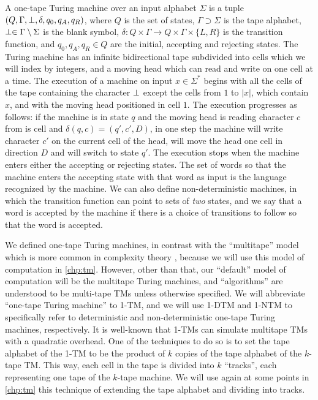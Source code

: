 A one-tape Turing machine over an input alphabet $\Sigma$ is a tuple $(Q, \Gamma, \perp, 
\delta, q_0, q_A, q_R)$, where $Q$ is the set of states, $\Gamma \supset \Sigma$ is the tape alphabet,
$\perp \in \Gamma \setminus \Sigma$ is the blank symbol, 
$\delta \colon Q \times \Gamma \to Q \times \Gamma \times \{L, R\}$ is the transition function, and
$q_0, q_A, q_R \in Q$ are the initial, accepting and rejecting states. The Turing machine 
has an infinite bidirectional tape subdivided into cells which we will index by integers, 
and a moving head which can read and write on one cell at a time. 
The execution of a machine on input $x \in \Sigma^*$ begins with all the 
cells of the tape containing the character $\perp$ except the cells from
$1$ to $|x|$, which contain $x$, and with the moving head positioned in cell $1$.
The execution progresses as follows: if the machine is in state $q$ and the 
moving head is reading character $c$ from is cell and $\delta(q, c) = (q', c', D)$,
in one step the machine will write character $c'$ on the current cell of the head,
will move the head one cell in direction $D$ and will switch to state $q'$. 
The execution stops when the machine enters either the accepting or rejecting 
states. The set of words so that the machine enters the accepting state with that 
word as input is the language recognized by the machine. We can also define non-deterministic
machines, in which the transition function can point to sets of \emph{two} states, and 
we say that a word is accepted by the machine if there is a choice of transitions to follow
so that the word is accepted. 

We defined one-tape Turing machines, in contrast with the 
``multitape'' model which is more common in complexity theory \cite{AB09}, because 
we will use this model of computation in \cref{chp:tm}. However, other than that, 
our ``default'' model of computation will be the multitape Turing machines, and 
``algorithms'' are understood to be multi-tape TMs unless otherwise specified. 
We will abbreviate 
``one-tape Turing machine'' to 1-TM, and we will use 1-DTM and 1-NTM to specifically 
refer to deterministic and non-deterministic one-tape Turing machines, respectively.
It is well-known that 1-TMs can simulate multitape TMs with a quadratic overhead. 
One of the techniques to do so is to set the tape alphabet of the 1-TM to be the product
of $k$ copies of the tape alphabet of the $k$-tape TM. This way, each cell in the tape is divided 
into $k$ ``tracks'', each representing one tape of the $k$-tape machine. We will use again
at some points in \cref{chp:tm}
this technique of extending the tape alphabet and dividing into tracks. 

